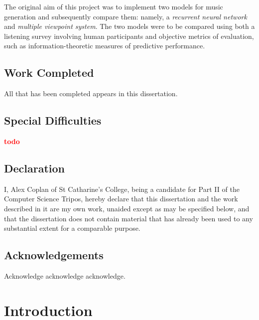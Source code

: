 \documentclass[12pt,a4paper,twoside,openright]{report}
\newcommand{\todo}{\textcolor{red}{\textbf{todo}~}}
\begin{document}
The original aim of this project was to implement two models for music
generation and subsequently compare them: namely, a \emph{recurrent neural
network} and \emph{multiple viewpoint system}. The two models were
to be compared using both a listening survey involving human participants and
objective metrics of evaluation, such as information-theoretic measures
of predictive performance.

\section*{Work Completed}

All that has been completed appears in this dissertation.

\section*{Special Difficulties}

\todo
 
\newpage
\section*{Declaration}

I, Alex Coplan of St Catharine's College, being a candidate for Part II of the
Computer Science Tripos, hereby declare that this dissertation and the work
described in it are my own work, unaided except as may be specified below, and
that the dissertation does not contain material that has already been used to
any substantial extent for a comparable purpose.

\bigskip
{}

\medskip
{}

\tableofcontents

\listoffigures

\newpage
\section*{Acknowledgements}

Acknowledge acknowledge acknowledge.


\pagestyle{headings}

\chapter{Introduction}
\end{document}
